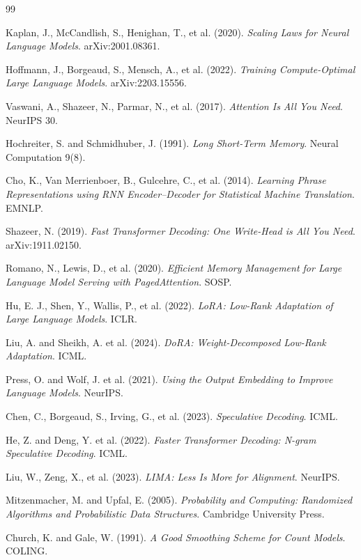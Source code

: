 \documentclass[11pt,a4paper]{article}
\begin{document}
\begin{thebibliography}{99}

Kaplan, J., McCandlish, S., Henighan, T., et al. (2020).
\emph{Scaling Laws for Neural Language Models}. arXiv:2001.08361.

Hoffmann, J., Borgeaud, S., Mensch, A., et al. (2022).
\emph{Training Compute-Optimal Large Language Models}. arXiv:2203.15556.

Vaswani, A., Shazeer, N., Parmar, N., et al. (2017).
\emph{Attention Is All You Need}. NeurIPS 30.

Hochreiter, S. and Schmidhuber, J. (1991).
\emph{Long Short-Term Memory}. Neural Computation 9(8).

Cho, K., Van Merrienboer, B., Gulcehre, C., et al. (2014).
\emph{Learning Phrase Representations using RNN Encoder--Decoder for Statistical
Machine Translation}. EMNLP.

Shazeer, N. (2019).
\emph{Fast Transformer Decoding: One Write-Head is All You Need}.
arXiv:1911.02150.

Romano, N., Lewis, D., et al. (2020).
\emph{Efficient Memory Management for Large Language Model Serving with
PagedAttention}. SOSP.

Hu, E. J., Shen, Y., Wallis, P., et al. (2022).
\emph{LoRA: Low-Rank Adaptation of Large Language Models}. ICLR.

Liu, A. and Sheikh, A. et al. (2024).
\emph{DoRA: Weight-Decomposed Low-Rank Adaptation}. ICML.

Press, O. and Wolf, J. et al. (2021).
\emph{Using the Output Embedding to Improve Language Models}. NeurIPS.

Chen, C., Borgeaud, S., Irving, G., et al. (2023).
\emph{Speculative Decoding}. ICML.

He, Z. and Deng, Y. et al. (2022).
\emph{Faster Transformer Decoding: N-gram Speculative Decoding}. ICML.

Liu, W., Zeng, X., et al. (2023).
\emph{LIMA: Less Is More for Alignment}. NeurIPS.

Mitzenmacher, M. and Upfal, E. (2005).
\emph{Probability and Computing: Randomized Algorithms and Probabilistic
Data Structures}. Cambridge University Press.

Church, K. and Gale, W. (1991).
\emph{A Good Smoothing Scheme for Count Models}. COLING.


\end{thebibliography}
\end{document}

